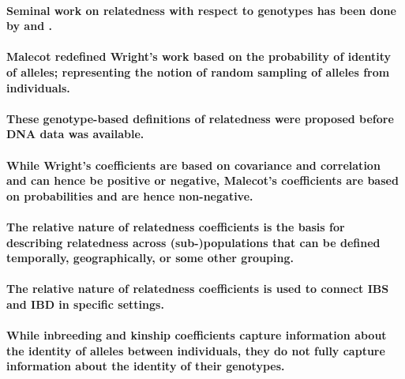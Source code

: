 {%
\paragraph{Seminal work on relatedness with respect to genotypes has been
done by \cite{cotterman1940calculus} and
\cite{malecot1948mathematiques, malecot1969mathemathics}.}

\paragraph{Malecot redefined Wright's work based on the
probability of identity of alleles; representing the
notion of random sampling of alleles from individuals.}

\paragraph{These genotype-based definitions of relatedness were proposed
before DNA data was available.}

\paragraph{While Wright's coefficients are based on covariance and
correlation and can hence be positive or negative,
Malecot's coefficients are based on probabilities and are hence
non-negative.}

\paragraph{The relative nature of relatedness coefficients is the basis
for describing relatedness across (sub-)populations that can be defined
temporally, geographically, or some other grouping.}

\paragraph{The relative nature of relatedness coefficients is used to
connect IBS and IBD in specific settings.}

\paragraph{While inbreeding and kinship coefficients capture information
about the identity of alleles between individuals, they do not fully
capture information about the identity of their genotypes.}

}
